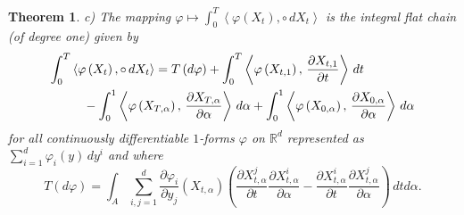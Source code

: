 \documentclass{article}
\newtheorem{theorem}{Theorem}
\begin{document}
\begin{theorem}
c) The mapping $\varphi \mapsto \int_{0}^{T}\left\langle \varphi \left(
X_{t}\right) ,\circ \,dX_{t}\right\rangle $ is the integral flat chain (of
degree one) given by
\begin{equation}
  \label{chain}
  \begin{split}
\int_{0}^{T} &\left\langle \varphi \left( X_{t}\right) ,\circ
\,dX_{t}\right\rangle  = T\left( d\varphi \right)   
+\int_{0}^{T}\left\langle \varphi \left( X_{t,1}\right) ,\,\frac{\partial
X_{t,1}}{\partial t}\right\rangle \,dt   
\\ & \quad -\int_{0}^{1}\left\langle \varphi \left( X_{T,\alpha }\right) ,\,\frac{%
\partial X_{T,\alpha }}{\partial \alpha }\right\rangle \,d\alpha
+\int_{0}^{1}\left\langle \varphi \left( X_{0,\alpha }\right) ,\,\frac{%
\partial X_{0,\alpha }}{\partial \alpha }\right\rangle \,d\alpha     
  \end{split}
\end{equation}
for all continuously differentiable $1$-forms $\varphi $ on $\mathbb{R}^{d}$
represented as 
$
\sum_{i=1}^{d}\varphi _{i}\left( y\right) \,dy^{i}
$ and where
\begin{equation*}
T\left( d\varphi \right) =\int_{A}\sum_{i,j=1}^{d}\frac{\partial \varphi _{i}%
}{\partial y_{j}}\left( X_{t,\alpha }\right) \left( \frac{\partial
X_{t,\alpha }^{j}}{\partial t}\frac{\partial X_{t,\alpha }^{i}}{\partial
\alpha }-\frac{\partial X_{t,\alpha }^{i}}{\partial t}\frac{\partial
X_{t,\alpha }^{j}}{\partial \alpha }\right) \,dtd\alpha .
\end{equation*}
\end{theorem}
\end{document}
